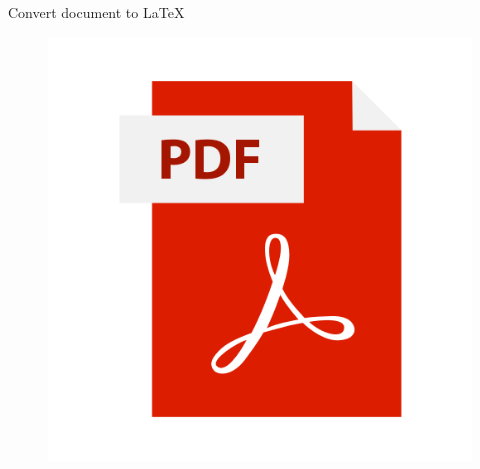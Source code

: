 \documentclass[aspectratio=169]{beamer}
\begin{document}
\begin{frame}{Convert document to \LaTeX}
\begin{minipage}[t]{0.45\linewidth}
\begin{figure}
        \end{figure}
    \end{minipage}
    \hfill
    \begin{minipage}[t]{0.25\linewidth}
        \begin{figure}
            \vspace{10mm}
            \includegraphics[height=0.4\textheight]{image/image5.png}
        \end{figure}
    \end{minipage}

\end{frame}
\end{document}
